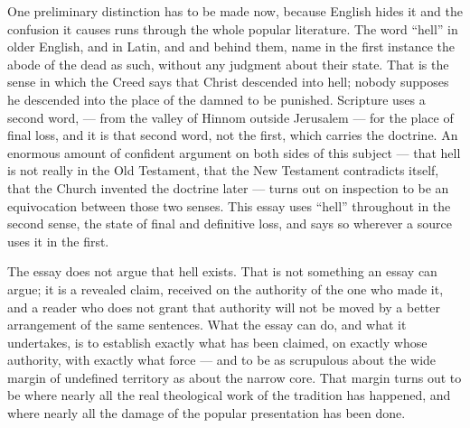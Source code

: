 One preliminary distinction has to be made now, because English hides it and the confusion it causes runs through the whole popular literature. The word ``hell'' in older English, and  in Latin, and  and  behind them, name in the first instance the abode of the dead as such, without any judgment about their state. That is the sense in which the Creed says that Christ descended into hell; nobody supposes he descended into the place of the damned to be punished. Scripture uses a second word,  --- from the valley of Hinnom outside Jerusalem --- for the place of final loss, and it is that second word, not the first, which carries the doctrine. An enormous amount of confident argument on both sides of this subject --- that hell is not really in the Old Testament, that the New Testament contradicts itself, that the Church invented the doctrine later --- turns out on inspection to be an equivocation between those two senses. This essay uses ``hell'' throughout in the second sense, the state of final and definitive loss, and says so wherever a source uses it in the first.

The essay does not argue that hell exists. That is not something an essay can argue; it is a revealed claim, received on the authority of the one who made it, and a reader who does not grant that authority will not be moved by a better arrangement of the same sentences. What the essay can do, and what it undertakes, is to establish exactly what has been claimed, on exactly whose authority, with exactly what force --- and to be as scrupulous about the wide margin of undefined territory as about the narrow core. That margin turns out to be where nearly all the real theological work of the tradition has happened, and where nearly all the damage of the popular presentation has been done.
